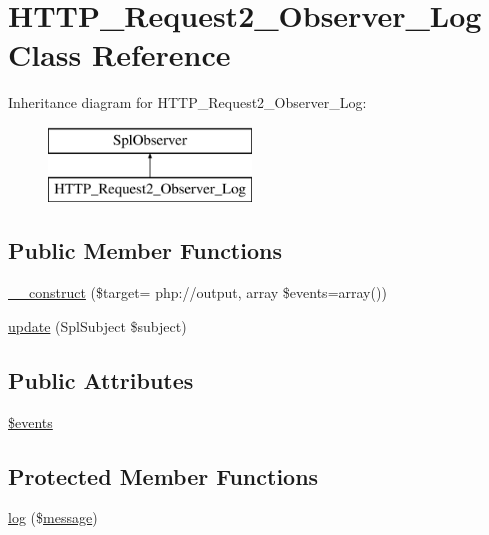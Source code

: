 \hypertarget{classHTTP__Request2__Observer__Log}{}\section{H\+T\+T\+P\+\_\+\+Request2\+\_\+\+Observer\+\_\+\+Log Class Reference}
\label{classHTTP__Request2__Observer__Log}
Inheritance diagram for H\+T\+T\+P\+\_\+\+Request2\+\_\+\+Observer\+\_\+\+Log\+:\begin{figure}[H]
\begin{center}
\leavevmode
\includegraphics[height=2.000000cm]{classHTTP__Request2__Observer__Log}
\end{center}
\end{figure}
\subsection*{Public Member Functions}
\begin{DoxyCompactItemize}
\item 
\hyperlink{classHTTP__Request2__Observer__Log_ac52da3d54a5034de7e5883c792b0131d}{\+\_\+\+\_\+construct} (\$target= \textquotesingle{}php\+://output\textquotesingle{}, array \$events=array())
\item 
\hyperlink{classHTTP__Request2__Observer__Log_a3afb07b1a609c2f3c12b9cd5fa267947}{update} (Spl\+Subject \$subject)
\end{DoxyCompactItemize}
\subsection*{Public Attributes}
\begin{DoxyCompactItemize}
\item 
\hyperlink{classHTTP__Request2__Observer__Log_a28a4c14e527f6e34cbd3f0c1fa482e97}{\$events}
\end{DoxyCompactItemize}
\subsection*{Protected Member Functions}
\begin{DoxyCompactItemize}
\item 
\hyperlink{classHTTP__Request2__Observer__Log_a253f36793403dd77277fb2e76d19c117}{log} (\$\hyperlink{classmessage}{message})
\end{DoxyCompactItemize}
